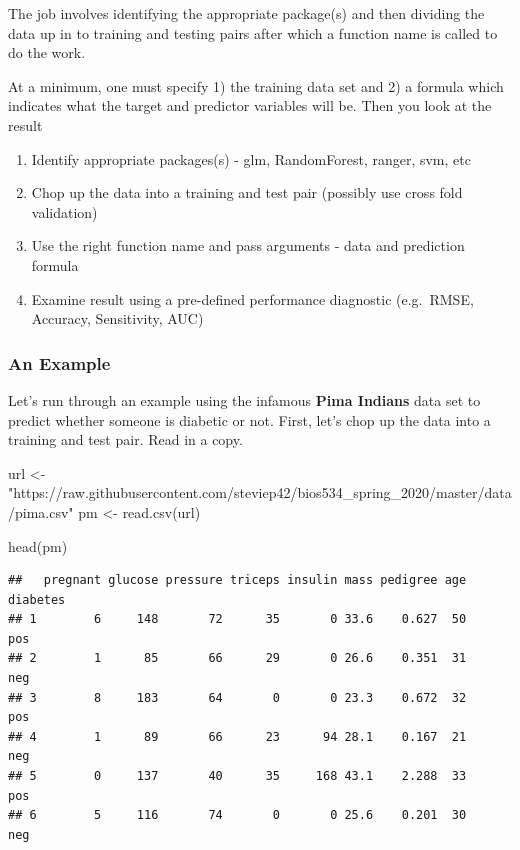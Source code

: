 \documentclass[
]{article}
\newenvironment{Shaded}{\begin{snugshade}}{\end{snugshade}}
\newcommand{\FunctionTok}[1]{\textcolor[rgb]{0.00,0.00,0.00}{#1}}
\newcommand{\NormalTok}[1]{#1}
\newcommand{\OtherTok}[1]{\textcolor[rgb]{0.56,0.35,0.01}{#1}}
\newcommand{\StringTok}[1]{\textcolor[rgb]{0.31,0.60,0.02}{#1}}
\providecommand{\tightlist}{%
  \setlength{\itemsep}{0pt}\setlength{\parskip}{0pt}}
\begin{document}
The job involves identifying the appropriate package(s) and then
dividing the data up in to training and testing pairs after which a
function name is called to do the work.

At a minimum, one must specify 1) the training data set and 2) a formula
which indicates what the target and predictor variables will be. Then
you look at the result

\begin{enumerate}
\def\labelenumi{\arabic{enumi})}
\tightlist
\item
  Identify appropriate packages(s) - glm, RandomForest, ranger, svm, etc
\item
  Chop up the data into a training and test pair (possibly use cross
  fold validation)
\item
  Use the right function name and pass arguments - data and prediction
  formula
\item
  Examine result using a pre-defined performance diagnostic (e.g.~RMSE,
  Accuracy, Sensitivity, AUC)
\end{enumerate}

\hypertarget{an-example}{%
\subsubsection{An Example}\label{an-example}}

Let's run through an example using the infamous \textbf{Pima Indians}
data set to predict whether someone is diabetic or not. First, let's
chop up the data into a training and test pair. Read in a copy.

\begin{Shaded}
\begin{Highlighting}[]
\NormalTok{url }\OtherTok{\textless{}{-}} \StringTok{"https://raw.githubusercontent.com/steviep42/bios534\_spring\_2020/master/data/pima.csv"}
\NormalTok{pm }\OtherTok{\textless{}{-}} \FunctionTok{read.csv}\NormalTok{(url)}

\FunctionTok{head}\NormalTok{(pm)}
\end{Highlighting}
\end{Shaded}

\begin{verbatim}
##   pregnant glucose pressure triceps insulin mass pedigree age diabetes
## 1        6     148       72      35       0 33.6    0.627  50      pos
## 2        1      85       66      29       0 26.6    0.351  31      neg
## 3        8     183       64       0       0 23.3    0.672  32      pos
## 4        1      89       66      23      94 28.1    0.167  21      neg
## 5        0     137       40      35     168 43.1    2.288  33      pos
## 6        5     116       74       0       0 25.6    0.201  30      neg
\end{verbatim}
\end{document}
